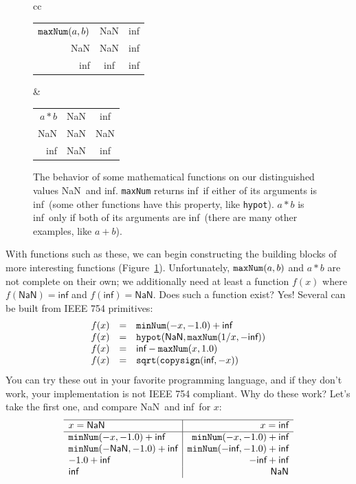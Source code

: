 \documentclass[twocolumn,cm]{article}
\newcommand\nan{\textsf{NaN}}
\renewcommand\inf{\textsf{inf}}
\begin{document}
\begin{figure}[ht]
\renewcommand*{\arraystretch}{1.4}
  \begin{tabular}{cc}
  \begin{tabular}{r|cc}
    \multicolumn{1}{r}{${\tt maxNum}(a,b)$} & \multicolumn{1}{c}{\nan} & \inf \\[0.2em]\cline{2-3}
    \nan & \nan & \inf \\
    \inf & \inf & \inf \\
  \end{tabular} &
  \begin{tabular}{r|cc}
    \multicolumn{1}{r}{$a * b$} & \multicolumn{1}{c}{\nan} & \inf \\[0.2em]\cline{2-3}
    \nan & \nan & \nan \\
    \inf & \nan & \inf \\
  \end{tabular}
  \end{tabular}
  \caption{
    The behavior of some mathematical functions on our distinguished values \nan\ and \inf.
    {\tt maxNum} returns \inf\ if either of its arguments is \inf\ (some other functions have
    this property, like {\tt hypot}). $a * b$ is \inf\ only
    if both of its arguments are \inf\ (there are many other examples, like $a + b$).
  } \label{fig:truthtables}
\end{figure}

With functions such as these, we can begin constructing the building blocks
of more interesting functions (Figure~\ref{fig:truthtables}). Unfortunately,
${\tt maxNum}(a,b)$ and $a*b$ are not complete on their own; we additionally
need at least a function $f(x)$ where $f(\nan) = \inf$ and $f(\inf) = \nan$.
Does such a function exist? Yes! Several can be built from IEEE 754 primitives:
\[
\begin{array}{rcl}
  f(x) & = & {\tt minNum}(-x, -1.0) + \inf \\
  f(x) & = & {\tt hypot}(\nan, {\tt maxNum}(1/x, -\inf)) \\
  f(x) & = & \inf - {\tt maxNum}(x, 1.0) \\
  f(x) & = & {\tt sqrt}({\tt copysign}(\inf, -x)) \\
\end{array}
\]
You can try these out in your favorite programming language, and if they don't
work, your implementation is not IEEE 754 compliant. Why do these work? Let's
take the first one, and compare \nan\ and \inf\ for $x$:
\[
\begin{array}{l|r}
  \hline
  x = \nan                             & x = \inf \\
  \hline
  {\tt minNum}(-x, -1.0) + \inf    & {\tt minNum}(-x, -1.0) + \inf \\
  {\tt minNum}(-\nan, -1.0) + \inf & {\tt minNum}(-\inf, -1.0) + \inf \\
      -1.0 + \inf                      & -\inf + \inf \\
      \inf                             & \nan \\
\end{array}
\]
\end{document}
